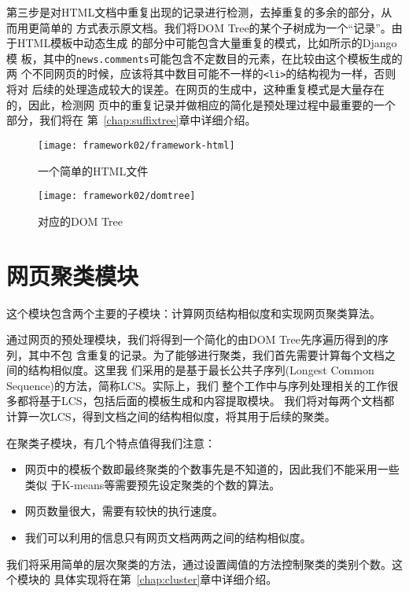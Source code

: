 第三步是对HTML文档中重复出现的记录进行检测，去掉重复的多余的部分，从而用更简单的
方式表示原文档。我们将DOM Tree的某个子树成为一个“记录”。由于HTML模板中动态生成
的部分中可能包含大量重复的模式，比如所示的Django模
板，其中的\texttt{news.comments}可能包含不定数目的元素，在比较由这个模板生成的两
个不同网页的时候，应该将其中数目可能不一样的\texttt{<li>}的结构视为一样，否则将对
后续的处理造成较大的误差。在网页的生成中，这种重复模式是大量存在的，因此，检测网
页中的重复记录并做相应的简化是预处理过程中最重要的一个部分，我们将在
第~\ref{chap:suffixtree}章中详细介绍。
\begin{figure}
  \begin{minipage}[t]{0.5\linewidth}
  \centering
  \texttt{[image: framework02/framework-html]}
  \caption{一个简单的HTML文件}
  \label{framework:fig:html}
\end{minipage}
\begin{minipage}[t]{0.5\linewidth}
  \centering
  \texttt{[image: framework02/domtree]}
  \caption{对应的DOM Tree}
  \label{framework:fig:domtree}
\end{minipage}
\end{figure}
\section{网页聚类模块}
\label{sec:clusterintro}
这个模块包含两个主要的子模块：计算网页结构相似度和实现网页聚类算法。

通过网页的预处理模块，我们将得到一个简化的由DOM Tree先序遍历得到的序列，其中不包
含重复的记录。为了能够进行聚类，我们首先需要计算每个文档之间的结构相似度。这里我
们采用的是基于最长公共子序列(Longest Common Sequence)的方法，简称LCS。实际上，我们
整个工作中与序列处理相关的工作很多都将基于LCS，包括后面的模板生成和内容提取模块。
我们将对每两个文档都计算一次LCS，得到文档之间的结构相似度，将其用于后续的聚类。

在聚类子模块，有几个特点值得我们注意：
\begin{itemize}
\item 网页中的模板个数即最终聚类的个数事先是不知道的，因此我们不能采用一些类似
  于K-means等需要预先设定聚类的个数的算法。
\item 网页数量很大，需要有较快的执行速度。
\item 我们可以利用的信息只有网页文档两两之间的结构相似度。
\end{itemize}

我们将采用简单的层次聚类的方法，通过设置阈值的方法控制聚类的类别个数。这个模块的
具体实现将在第~\ref{chap:cluster}章中详细介绍。
